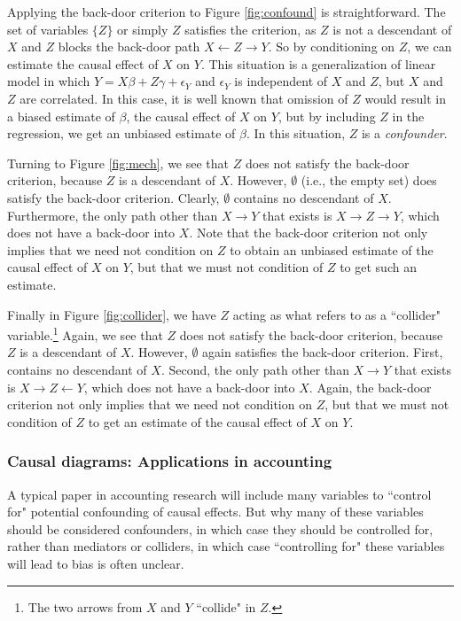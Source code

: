 \documentclass[11pt,reqno]{amsart}
\begin{document}
\begin{doublespace}
Applying the back-door criterion to Figure \ref{fig:confound} is straightforward. 
The set of variables $\{Z\}$ or simply $Z$ satisfies the criterion, as $Z$ is not a descendant of $X$ and $Z$ blocks the back-door path $X \leftarrow Z \rightarrow Y$.
So by conditioning on $Z$, we can estimate the causal effect of $X$ on $Y$.
This situation is a generalization of linear model in which $Y = X \beta + Z \gamma + \epsilon_Y$ and $\epsilon_Y$ is independent of $X$ and $Z$, but $X$ and $Z$ are correlated.
In this case, it is well known that omission of $Z$ would result in a biased estimate of $\beta$, the causal effect of $X$ on $Y$, but by including $Z$ in the regression, we get an unbiased estimate of $\beta$.
In this situation, $Z$ is a \emph{confounder}.

Turning to Figure \ref{fig:mech}, we see that $Z$ does not satisfy the back-door criterion, because $Z$ is a descendant of $X$.
However, $\emptyset$ (i.e., the empty set) does satisfy the back-door criterion.
Clearly, $\emptyset$ contains no descendant of $X$.
Furthermore, the only path other than $X \rightarrow Y$ that exists is $X \rightarrow Z \rightarrow Y$, which does not have a back-door into $X$.
Note that the back-door criterion not only implies that we need not condition on $Z$ to obtain an unbiased estimate of the causal effect of $X$ on $Y$, but that we must not condition of $Z$ to get such an estimate.

Finally in Figure \ref{fig:collider}, we have $Z$ acting as what \citep[p.\,17]{Pearl:2009kh} refers to as a ``collider" variable.\footnote{
The two arrows from $X$ and $Y$ ``collide" in $Z$.} 
Again, we see that $Z$ does not satisfy the back-door criterion, because $Z$ is a descendant of $X$.
However, $\emptyset$ again satisfies the back-door criterion.
First, contains no descendant of $X$.
Second, the only path other than $X \rightarrow Y$ that exists is $X \rightarrow Z \leftarrow Y$, which does not have a back-door into $X$.
Again, the back-door criterion not only implies that we need not condition on $Z$, but that we must not condition of $Z$ to get an estimate of the causal effect of $X$ on $Y$.

\subsubsection{Causal diagrams: Applications in accounting}
A typical paper in accounting research will include many variables  to ``control for" potential confounding of causal effects.
But why many of these variables should be considered confounders, in which case they should be controlled for, rather than mediators or colliders, in which case ``controlling for" these variables will lead to bias is often unclear.


\end{doublespace}
\end{document}
